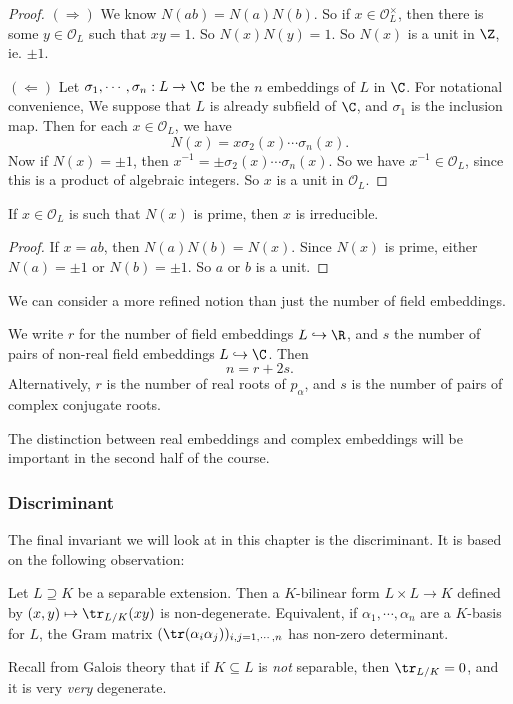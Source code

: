 \documentclass[a4paper]{article}
\begin{document}
\begin{proof}
  $(\Rightarrow)$ We know $N(a b) = N(a)N(b)$. So if $x \in \mathcal{O}_L^\times$, then there is some $y \in \mathcal{O}_L$ such that $xy = 1$. So $N(x) N(y) = 1$. So $N(x)$ is a unit in $\Z$, ie. $\pm 1$.

  $(\Leftarrow)$ Let $\sigma_1, \cdots, \sigma_n: L \to \C$ be the $n$ embeddings of $L$ in $\C$. For notational convenience, We suppose that $L$ is already subfield of $\C$, and $\sigma_1$ is the inclusion map. Then for each $x \in \mathcal{O}_L$, we have
  \[
    N(x) = x \sigma_2(x) \cdots \sigma_n(x).
  \]
  Now if $N(x) = \pm 1$, then $x^{-1} = \pm \sigma_2(x) \cdots \sigma_n(x)$. So we have $x^{-1} \in \mathcal{O}_L$, since this is a product of algebraic integers. So $x$ is a unit in $\mathcal{O}_L$.
\end{proof}

\begin{cor}
  If $x \in \mathcal{O}_L$ is such that $N(x)$ is prime, then $x$ is irreducible.
\end{cor}

\begin{proof}
  If $x = ab$, then $N(a)N(b) = N(x)$. Since $N(x)$ is prime, either $N(a) = \pm 1$ or $N(b) = \pm 1$. So $a$ or $b$ is a unit.
\end{proof}
We can consider a more refined notion than just the number of field embeddings.

\begin{defi}[$r$ and $s$]
  We write $r$ for the number of field embeddings $L \hookrightarrow \R$, and $s$ the number of pairs of non-real field embeddings $L \hookrightarrow \C$. Then
  \[
    n = r + 2s.
  \]
  Alternatively, $r$ is the number of real roots of $p_\alpha$, and $s$ is the number of pairs of complex conjugate roots.
\end{defi}
The distinction between real embeddings and complex embeddings will be important in the second half of the course.

\subsubsection*{Discriminant}
The final invariant we will look at in this chapter is the discriminant. It is based on the following observation:

\begin{prop}
  Let $L\supseteq K$ be a separable extension. Then a $K$-bilinear form $L \times L \to K$ defined by $(x, y) \mapsto \tr_{L/K}(xy)$ is non-degenerate. Equivalent, if $\alpha_1,\cdots, \alpha_n$ are a $K$-basis for $L$, the Gram matrix $(\tr(\alpha_i\alpha_j))_{i, j = 1, \cdots, n}$ has non-zero determinant.
\end{prop}
Recall from Galois theory that if $K \subseteq L$ is \emph{not} separable, then $\tr_{L/K} = 0$, and it is very \emph{very} degenerate.
\end{document}
